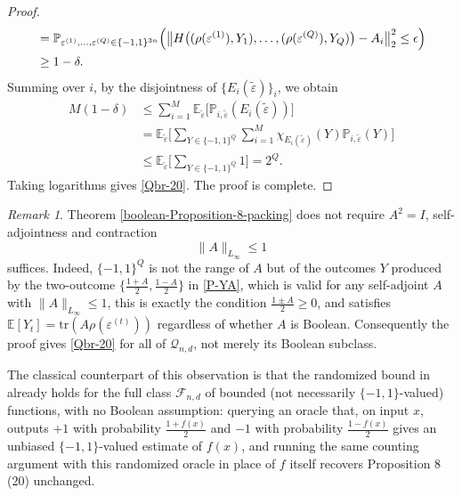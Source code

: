 \documentclass{amsbook}
\theoremstyle{definition}
\theoremstyle{remark}
\newtheorem{remark}[theorem]{Remark}
\numberwithin{section}{chapter}
\numberwithin{equation}{chapter}
\newcommand{\1}{\mathbf{1}}
\begin{document}
\begin{proof}
\begin{align*}
		&=\mathbb{P}_{\varepsilon^{(1)},\dots,\varepsilon^{(Q)}\in\{-1,1\}^{3n}}\Bigl(
		\bigl\|H\bigl((\rho(\varepsilon^{(1)}),Y_1),\dots,(\rho(\varepsilon^{(Q)}),Y_Q)\bigr)-A_i\bigr\|_2^2\le \epsilon
		\Bigr)\\
		&\geq 1-\delta.
	\end{align*}
	Summing over $i$,  by the disjointness of  $\{E_i(\widetilde{\varepsilon})\}_i$, we obtain
	\begin{align*}
		M(1-\delta)
		&\le \sum_{i=1}^M \mathbb E_{\widetilde{\varepsilon}}
		\big[\mathbb{P}_{i,\widetilde{\varepsilon}}(E_i(\widetilde{\varepsilon}))\big] \\
		&= \mathbb E_{\widetilde{\varepsilon}}
		\Big[\sum_{Y\in\{-1,1\}^Q}\sum_{i=1}^M
		\chi_{E_i(\widetilde{\varepsilon})}(Y)\mathbb P_{i,\widetilde{\varepsilon}}(Y)
		\Big] \\
		&\le \mathbb E_{\widetilde{\varepsilon}}
		\Big[\sum_{Y\in\{-1,1\}^Q}1\Big]
		= 2^Q.
	\end{align*}
 Taking logarithms gives \eqref{Qbr-20}. The proof is complete.
\end{proof}




\begin{remark}
Theorem \ref{boolean-Proposition-8-packing} does not require $A^2=I$, self-adjointness and contraction $$\|A\|_{L_\infty}\leq 1$$ suffices. Indeed, $\{-1,1\}^Q$ is not the range of $A$ but of the outcomes $Y$ produced by the two-outcome $\{\tfrac{1+A}{2},\tfrac{1-A}{2}\}$ in \eqref{P-YA}, which is valid for any self-adjoint $A$ with $\|A\|_{L_\infty}\leq 1$, this is exactly the condition $\tfrac{1\pm A}{2}\geq0$, and satisfies $\mathbb{E}[Y_t]=\mathrm{tr}(A\rho(\varepsilon^{(t)}))$ regardless of whether $A$ is Boolean. Consequently the proof gives \eqref{Qbr-20} for all of $\mathcal{Q}_{n,d}$, not merely its Boolean subclass.
		
The classical counterpart of this observation is that the randomized bound in \cite[(20) of Proposition 8]{EIS2023} already holds for the full class $\mathcal{F}_{n,d}$ of bounded (not necessarily $\{-1,1\}$-valued) functions, with no Boolean assumption: querying an oracle that, on input $x$, outputs $+1$ with probability $\tfrac{1+f(x)}{2}$ and $-1$ with probability $\tfrac{1-f(x)}{2}$ gives an unbiased $\{-1,1\}$-valued estimate of $f(x)$, and running the same counting argument with this randomized oracle in place of $f$ itself recovers Proposition 8 (20) unchanged. 
\end{remark}
\end{document}
